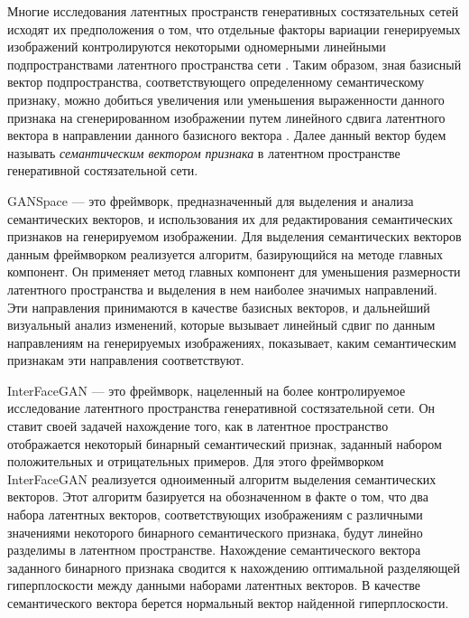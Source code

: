 Многие исследования латентных пространств генеративных состязательных сетей исходят их предположения о том, что отдельные факторы вариации генерируемых изображений контролируются некоторыми одномерными линейными подпространствами латентного пространства сети \cite{StyleGAN}.
Таким образом, зная базисный вектор подпространства, соответствующего определенному семантическому признаку, можно добиться увеличения или уменьшения выраженности данного признака на сгенерированном изображении путем линейного сдвига латентного вектора в направлении данного базисного вектора \cite{abdal2019image2stylegan}. 
Далее данный вектор будем называть \emph{семантическим вектором признака} в латентном пространстве генеративной состязательной сети.

GANSpace \cite{hrknen2020ganspace} --- это фреймворк, предназначенный для выделения и анализа семантических векторов, и использования их для редактирования семантических признаков на генерируемом изображении.
Для выделения семантических векторов данным фреймворком реализуется алгоритм, базирующийся на методе главных компонент.
Он применяет метод главных компонент для уменьшения размерности латентного пространства и выделения в нем наиболее значимых направлений. Эти направления принимаются в качестве базисных векторов, и дальнейший визуальный анализ изменений, которые вызывает линейный сдвиг по данным направлениям на генерируемых изображениях, показывает, каким семантическим признакам эти направления соответствуют.

InterFaceGAN \cite{shen2020interfacegan} --- это фреймворк, нацеленный на более контролируемое исследование латентного пространства генеративной состязательной сети.
Он ставит своей задачей нахождение того, как в латентное пространство отображается некоторый бинарный семантический признак, заданный набором положительных и отрицательных примеров.
Для этого фреймворком InterFaceGAN реализуется одноименный алгоритм выделения семантических векторов.
Этот алгоритм базируется на обозначенном в \cite{StyleGAN} факте о том, что два набора латентных векторов, соответствующих изображениям с различными значениями некоторого бинарного семантического признака, будут линейно разделимы в латентном пространстве.
Нахождение семантического вектора заданного бинарного признака сводится к нахождению оптимальной разделяющей гиперплоскости между данными наборами латентных векторов.
В качестве семантического вектора берется нормальный вектор найденной гиперплоскости.
